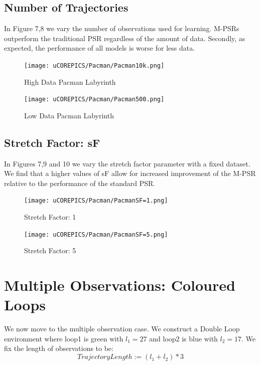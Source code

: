 \subsection{Number of Trajectories}

In Figure 7,8 we vary the number of observations used for learning. M-PSRs outperform the traditional PSR regardless of the amount of data. Secondly, as expected, the performance of all models is worse for less data.

\begin{figure}[ht!]
\centering
\texttt{[image: uCOREPICS/Pacman/Pacman10k.png]}
\caption{High Data Pacman Labyrinth\label{overflow}}
\end{figure}

\begin{figure}[ht!]
\centering
\texttt{[image: uCOREPICS/Pacman/Pacman500.png]}
\caption{Low Data Pacman Labyrinth\label{overflow}}
\end{figure}

\subsection{Stretch Factor: sF}

In Figures 7,9 and 10 we vary the stretch factor parameter with a fixed dataset. We find that a higher values of sF allow for increased improvement of the M-PSR relative to the performance of the standard PSR.

\begin{figure}[ht!]
\centering
\texttt{[image: uCOREPICS/Pacman/PacmanSF=1.png]}
\caption{Stretch Factor: 1\label{overflow}}
\end{figure}

\begin{figure}[ht!]
\centering
\texttt{[image: uCOREPICS/Pacman/PacmanSF=5.png]}
\caption{Stretch Factor: 5\label{overflow}}
\end{figure}

\section{Multiple Observations: Coloured Loops}

We now move to the multiple observation case. We construct a Double Loop environment where loop1 is green with $l_1=27$ and loop2 is blue with $l_2=17$. We fix the length of observations to be:
\begin{equation*}
TrajectoryLength := (l_1 + l_2)*3
\end{equation*} 

